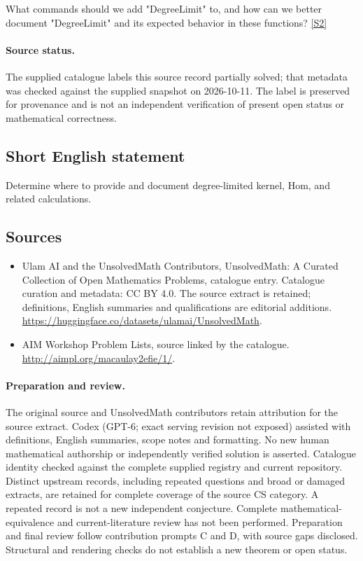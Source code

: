\documentclass[11pt]{article}
\newcommand{\sref}[2]{\hyperlink{source:#1:#2}{[S#2]}}
\begin{document}
What commands should we add "DegreeLimit" to, and how can we better document "DegreeLimit" and its expected behavior in these functions? \sref{statement}{2}
\paragraph{Source status.}
The supplied catalogue labels this source record partially solved; that metadata was checked against the supplied snapshot on 2026-10-11. The label is preserved for provenance and is not an independent verification of present open status or mathematical correctness.
\subsection{Short English statement}
Determine where to provide and document degree-limited kernel, Hom, and related calculations.
\subsection{Sources}
\begin{itemize}
\item[\hypertarget{source:statement:1}{S1}] Ulam AI and the UnsolvedMath Contributors, UnsolvedMath: A Curated Collection of Open Mathematics Problems, catalogue entry. Catalogue curation and metadata: CC BY 4.0. The source extract is retained; definitions, English summaries and qualifications are editorial additions.
\url{https://huggingface.co/datasets/ulamai/UnsolvedMath}.
\item[\hypertarget{source:statement:2}{S2}] AIM Workshop Problem Lists, source linked by the catalogue.
\url{http://aimpl.org/macaulay2efie/1/}.
\end{itemize}
\paragraph{Preparation and review.}
The original source and UnsolvedMath contributors retain attribution for the source extract. Codex (GPT-6; exact serving revision not exposed) assisted with definitions, English summaries, scope notes and formatting. No new human mathematical authorship or independently verified solution is asserted. Catalogue identity checked against the complete supplied registry and current repository. Distinct upstream records, including repeated questions and broad or damaged extracts, are retained for complete coverage of the source CS category. A repeated record is not a new independent conjecture. Complete mathematical-equivalence and current-literature review has not been performed. Preparation and final review follow contribution prompts C and D, with source gaps disclosed. Structural and rendering checks do not establish a new theorem or open status.
\label{end:statement}
\end{document}
